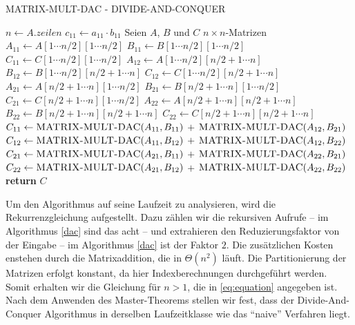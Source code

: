 \begin{algorithm}[hbt!]
\begin{algorithmic}[1]
\caption{MATRIX-MULT-DAC - DIVIDE-AND-CONQUER}
\label{dac}
    \State $n\gets A.zeilen$
        \State $c_{11}\gets a_{11}\cdot b_{11}$
    \Else  
        \State Seien $A$, $B$ und $C$ $n \times n$-Matrizen
        \State $A_{11}\gets A[1\dotsb n/2][1\dotsb n/2]$
        \State $B_{11}\gets B[1\dotsb n/2][1\dotsb n/2]$
        \State $C_{11}\gets C[1\dotsb n/2][1\dotsb n/2]$
        \State $A_{12}\gets A[1\dotsb n/2][n/2 + 1\dotsb n]$
        \State $B_{12}\gets B[1\dotsb n/2][n/2 + 1\dotsb n]$
        \State $C_{12}\gets C[1\dotsb n/2][n/2 + 1\dotsb n]$
        \State $A_{21}\gets A[n/2 + 1\dotsb n][1\dotsb n/2]$
        \State $B_{21}\gets B[n/2 + 1\dotsb n][1\dotsb n/2]$
        \State $C_{21}\gets C[n/2 + 1\dotsb n][1\dotsb n/2]$
        \State $A_{22}\gets A[n/2 + 1\dotsb n][n/2 + 1\dotsb n]$
        \State $B_{22}\gets B[n/2 + 1\dotsb n][n/2 + 1\dotsb n]$
        \State $C_{22}\gets C[n/2 + 1\dotsb n][n/2 + 1\dotsb n]$
        \State $C_{11}\gets \Call{MATRIX-MULT-DAC}{A_{11}, B_{11}}$ \newline
        \hspace*{4.65em} $+$ $\Call{MATRIX-MULT-DAC}{A_{12}, B_{21}}$
        \State $C_{12}\gets \Call{MATRIX-MULT-DAC}{A_{11}, B_{12}}$ \newline
        \hspace*{4.65em} $+$ $\Call{MATRIX-MULT-DAC}{A_{12}, B_{22}}$ 
        \State $C_{21}\gets \Call{MATRIX-MULT-DAC}{A_{21}, B_{11}}$ \newline
        \hspace*{4.65em} $+$ $\Call{MATRIX-MULT-DAC}{A_{22}, B_{21}}$
        \State $C_{22}\gets \Call{MATRIX-MULT-DAC}{A_{21}, B_{12}}$ \newline
        \hspace*{4.65em} $+$ $\Call{MATRIX-MULT-DAC}{A_{22}, B_{22}}$
    \EndIf
    \State \textbf{return} $C$ 
\EndProcedure
\end{algorithmic}
\end{algorithm}

Um den Algorithmus auf seine Laufzeit zu analysieren, wird die Rekurrenzgleichung aufgestellt. Dazu zählen wir die rekursiven Aufrufe -- im Algorithmus \ref{dac} sind das acht -- und extrahieren den Reduzierungsfaktor von der Eingabe -- im Algorithmus \ref{dac} ist der Faktor $2$. Die zusätzlichen Kosten enstehen durch die Matrixaddition, die in $\Theta(n^2)$ läuft. Die Partitionierung der Matrizen erfolgt konstant, da hier Indexberechnungen durchgeführt werden. Somit erhalten wir die Gleichung für $n > 1$, die in \ref{eq:equation} angegeben ist. Nach dem Anwenden des Master-Theorems stellen wir fest, dass der Divide-And-Conquer Algorithmus in derselben Laufzeitklasse wie das \enquote{naive} Verfahren liegt.

